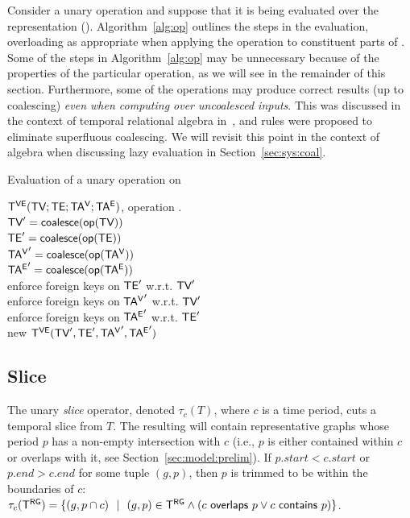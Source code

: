 Consider a unary operation \opp and suppose that it is being evaluated
over the \ve representation \opp(\tve).  Algorithm~\ref{alg:op}
outlines the steps in the evaluation, overloading \opp as appropriate
when applying the operation to constituent parts of \tve.  Some of the
steps in Algorithm~\ref{alg:op} may be unnecessary because of the
properties of the particular operation, as we will see in the
remainder of this section.  Furthermore, some of the operations may
produce correct results (up to coalescing) {\em even when computing
  over uncoalesced inputs}.  This was discussed in the context of
temporal relational algebra in~\cite{DBLP:conf/vldb/BohlenSS96}, and
rules were proposed to eliminate superfluous coalescing. We will
revisit this point in the context of \tg algebra when discussing lazy
evaluation in Section~\ref{sec:sys:coal}.

\begin{algorithm}[h!]
\caption{Evaluation of a unary operation \opp on \tve}
\begin{algorithmic}[1]
\REQUIRE \tg $\mathsf{T^{VE}} (\textsf{TV}; \textsf{TE}; \mathsf{TA^{V}}; \mathsf{TA^{E}})$, operation .\\
\STATE  $\textsf{TV}' = \textsf{coalesce} (\textsf{op}(\textsf{TV}))$\\
\STATE  $\textsf{TE}' = \textsf{coalesce} (\textsf{op}(\textsf{TE}))$\\
\STATE  $\mathsf{TA^{V}}' = \textsf{coalesce} (\textsf{op}(\mathsf{TA^{V}}))$\\
\STATE  $\mathsf{TA^{E}}' = \textsf{coalesce} (\textsf{op}(\mathsf{TA^{E}}))$\\
\STATE  enforce foreign keys on $\textsf{TE}'$ w.r.t. $\textsf{TV}'$\\
\STATE  enforce foreign keys on $\mathsf{TA^{V}}'$ w.r.t. $\textsf{TV}'$\\
\STATE  enforce foreign keys on $\mathsf{TA^{E}}'$ w.r.t. $\textsf{TE}'$\\
\RETURN new $\mathsf{T^{VE}} (\textsf{TV}', \textsf{TE}', \mathsf{TA^{V}}', \mathsf{TA^{E}}')$\\
\end{algorithmic}
\label{alg:op}
\end{algorithm}

\subsection{Slice}
\label{sec:algebra:slice}

The unary {\em slice} operator, denoted $\tau_c (T)$, where $c$ is a
time period, cuts a temporal slice from $T$.  The resulting \tg will
contain representative graphs whose period $p$ has a non-empty
intersection with $c$ (i.e., $p$ is either contained within $c$ or
overlaps with it, see Section~\ref{sec:model:prelim}).  If $p.start <
c.start$ or $p.end > c.end$ for some tuple $(g, p)$, then $p$ is
trimmed to be within the boundaries of $c$: $\tau_c (\mathsf{T^{RG}}) = \{ (g, p
\cap c)~~|~~(g, p) \in \mathsf{T^{RG}} \wedge (c~\mathsf{overlaps}~p \vee
c~\mathsf{contains}~p)\}$.

